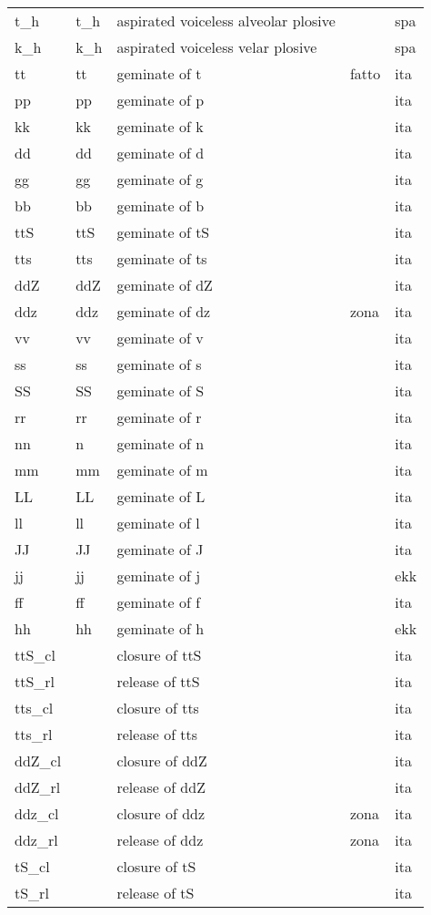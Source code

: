 \begin{longtable}{llp{}ll}
	t\_h & t\_h & aspirated voiceless alveolar plosive & & spa\\
	k\_h & k\_h & aspirated voiceless velar plosive & & spa\\
	tt & tt & geminate of t & fatto & ita\\
	pp & pp & geminate of p & & ita\\
	kk & kk & geminate of k & & ita\\
	dd & dd & geminate of d & & ita\\
	gg & gg & geminate of g & & ita\\
	bb & bb & geminate of b & & ita\\
	ttS & ttS & geminate of tS & & ita\\
	tts & tts & geminate of ts & & ita\\
	ddZ & ddZ & geminate of dZ & & ita\\
	ddz & ddz & geminate of dz & zona & ita\\
	vv & vv & geminate of v & & ita\\
	ss & ss & geminate of s & & ita\\
	SS & SS & geminate of S & & ita\\
	rr & rr & geminate of r & & ita\\
	nn & n & geminate of n & & ita\\
	mm & mm & geminate of m & & ita\\
	LL & LL & geminate of L & & ita\\
	ll & ll & geminate of l & & ita\\
	JJ & JJ & geminate of J & & ita\\
	jj & jj & geminate of j & & ekk\\
	ff & ff & geminate of f & & ita\\
	hh & hh & geminate of h & & ekk\\
	ttS\_cl & & closure of ttS & & ita\\
	ttS\_rl & & release of ttS & & ita\\
	tts\_cl & & closure of tts & & ita\\
	tts\_rl & & release of tts & & ita\\
	ddZ\_cl & & closure of ddZ & & ita\\
	ddZ\_rl & & release of ddZ & & ita\\
	ddz\_cl & & closure of ddz & zona & ita\\
	ddz\_rl & & release of ddz & zona & ita\\
	tS\_cl & & closure of tS & & ita\\
	tS\_rl & & release of tS & & ita\\

\end{longtable}
